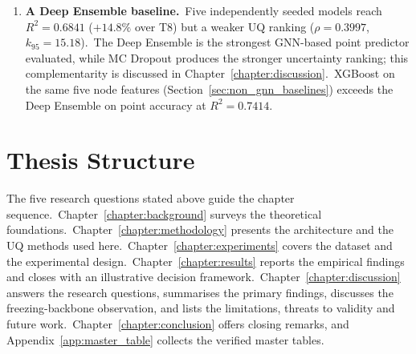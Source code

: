 \begin{enumerate}
 \item \textbf{A Deep Ensemble baseline.}\ Five independently seeded models reach $R^2 = 0.6841$ ($+14.8\%$ over T8) but a weaker UQ ranking ($\rho = 0.3997$, $k_{95} = 15.18$).\ The Deep Ensemble is the strongest GNN-based point predictor evaluated, while MC Dropout produces the stronger uncertainty ranking; this complementarity is discussed in Chapter~\ref{chapter:discussion}.\ XGBoost on the same five node features (Section~\ref{sec:non_gnn_baselines}) exceeds the Deep Ensemble on point accuracy at $R^2 = 0.7414$.
\end{enumerate}

\section{Thesis Structure}\label{sec:structure}

The five research questions stated above guide the chapter sequence.\ Chapter~\ref{chapter:background} surveys the theoretical foundations.\ Chapter~\ref{chapter:methodology} presents the architecture and the UQ methods used here.\ Chapter~\ref{chapter:experiments} covers the dataset and the experimental design.\ Chapter~\ref{chapter:results} reports the empirical findings and closes with an illustrative decision framework.\ Chapter~\ref{chapter:discussion} answers the research questions, summarises the primary findings, discusses the freezing-backbone observation, and lists the limitations, threats to validity and future work.\ Chapter~\ref{chapter:conclusion} offers closing remarks, and Appendix~\ref{app:master_table} collects the verified master tables.
